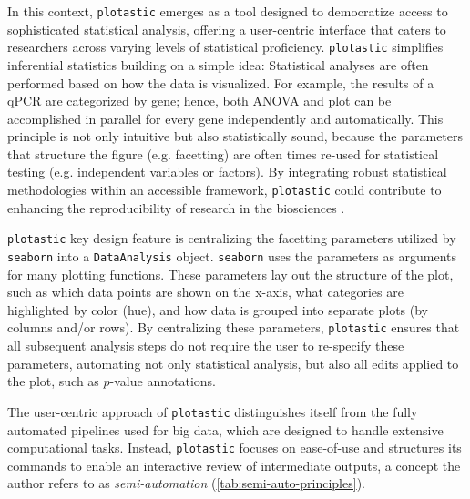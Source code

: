 In this context, \texttt{plotastic} emerges as a tool designed to democratize
access to sophisticated statistical analysis, offering a user-centric interface
that caters to researchers across varying levels of statistical proficiency.
\texttt{plotastic} simplifies inferential statistics building on a simple idea:
Statistical analyses are often performed based on how the data is visualized.
For example, the results of a qPCR are categorized by gene; hence, both ANOVA
and plot can be accomplished in parallel for every gene independently and
automatically. This principle is not only intuitive but also statistically
sound, because the parameters that structure the figure (e.g. facetting) are
often times re-used for statistical testing (e.g. independent variables or
factors). By integrating robust statistical methodologies within an accessible
framework, \texttt{plotastic} could contribute to enhancing the reproducibility
of research in the biosciences \cite{gomez-cabreroDataIntegrationEra2014}.

\texttt{plotastic} key design feature is centralizing the facetting parameters
utilized by \texttt{seaborn} into a \texttt{DataAnalysis} object.
\texttt{seaborn} uses the parameters \facetparams as arguments for many plotting
functions. These parameters lay out the structure of the plot, such as which
data points are shown on the x-axis, what categories are highlighted by color
(hue), and how data is grouped into separate plots (by columns and/or rows). By
centralizing these parameters, \texttt{plotastic} ensures that all subsequent
analysis steps do not require the user to re-specify these parameters,
automating not only statistical analysis, but also all edits applied to the
plot, such as $p$-value annotations.


The user-centric approach of \texttt{plotastic} distinguishes itself from the
fully automated pipelines used for big data, which are designed to handle
extensive computational tasks. Instead, \texttt{plotastic} focuses on
ease-of-use and structures its commands to enable an interactive review of
intermediate outputs, a concept the author refers to as \textit{semi-automation}
(\autoref{tab:semi-auto-principles}).

